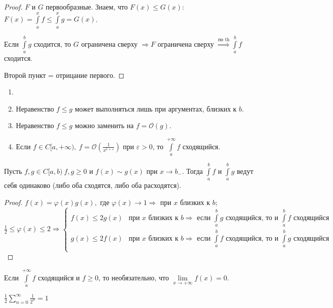 \begin{proof}
    $F$ и $G$ первообразные. Знаем, что $F(x)\leq G(x)$: $F(x)=\int\limits_a^x f \leq \int\limits_a^x g=G(x)$.

    Если $\int\limits_a^b g$ сходится, то $G$ ограничена сверху $\Rightarrow F$ ограничена сверху $\overset{\text{по th}}{\Rightarrow}\int\limits_a^b f$ сходится.

    Второй пункт = отрицание первого.
\end{proof}

\begin{remark}
    \begin{enumerate}
        \item[]
        \item Неравенство $f\leq g$ может выполняться лишь при аргументах, близких к $b$.
        \item Неравенство $f\leq g$ можно заменить на $f=\mathcal{O}(g)$.
        \item Если $f\in C[a,+\infty),\ f=\mathcal{O}(\frac{1}{x^{1+\varepsilon}})$ при $\varepsilon>0$, то $\int\limits_a^{+\infty} f$ сходящийся.
    \end{enumerate}
\end{remark}

\begin{corollary}
    Пусть $f, g\in C[a, b) \ f, g\geq 0$ и $f(x)\sim g(x)$ при $x\rightarrow b_-$. Тогда $\int\limits_a^b f$ и $\int\limits_a^b g$ ведут себя одинаково (либо оба сходятся, либо оба расходятся).
\end{corollary}

\begin{proof}
    $f(x)=\varphi(x)g(x),$ где $\varphi(x)\rightarrow 1\Rightarrow$ при $x$ близких к $b$; $\frac{1}{2}\leq \varphi(x)\leq 2\Rightarrow \begin{cases}
        f(x) \leq 2 g(x) & \text{при $x$ близких к $b\Rightarrow$ если $\int\limits_a^b g$ сходящийся, то и $\int\limits_a^b f$ сходящийся} \\
        g(x) \leq 2 f(x) & \text{при $x$ близких к $b\Rightarrow$ если $\int\limits_a^b f$ сходящийся, то и $\int\limits_a^b g$ сходящийся} \\
    \end{cases}$
\end{proof}

\begin{remark}
    Если $\int\limits_a^{+\infty}f$ сходящийся и $f\geq 0$, то необязательно, что $\lim\limits_{x\rightarrow +\infty} f(x)=0$.

    $\frac{1}{2}\sum\limits_{n=0}^\infty\frac{1}{2^n}=1$
\end{remark}